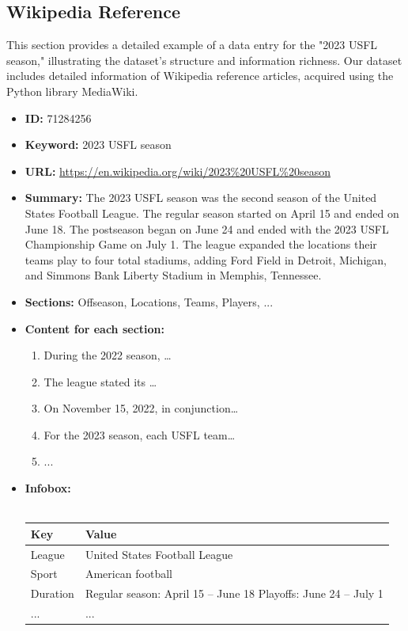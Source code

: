 \subsection{Wikipedia Reference}
This section provides a detailed example of a data entry for the "2023 USFL season," illustrating the dataset's structure and information richness.
Our dataset includes detailed information of Wikipedia reference articles, acquired using the Python library MediaWiki.
\begin{tcolorbox}
\begin{itemize}
    \item \textbf{ID:} 71284256
    \item \textbf{Keyword:} 2023 USFL season
    \item \textbf{URL:} \url{https://en.wikipedia.org/wiki/2023%20USFL%20season}
    \item \textbf{Summary:} The 2023 USFL season was the second season of the United States Football League. The regular season started on April 15 and ended on June 18. The postseason began on June 24 and ended with the 2023 USFL Championship Game on July 1. The league expanded the locations their teams play to four total stadiums, adding Ford Field in Detroit, Michigan, and Simmons Bank Liberty Stadium in Memphis, Tennessee.
    \item \textbf{Sections:} Offseason, Locations, Teams, Players, ...
    \item \textbf{Content for each section:} 
    \begin{enumerate}
        \item During the 2022 season, …
        \item The league stated its …
        \item On November 15, 2022, in conjunction…
        \item For the 2023 season, each USFL team…
        \item ...
    \end{enumerate}
    \item \textbf{Infobox:}  \\
    \\
    \begin{tabular}{|l|p{10cm}|}
    \hline
    \textbf{Key} & \textbf{Value} \\
    \hline
    League & United States Football League \\
    Sport & American football \\
    Duration & Regular season: April 15 – June 18 Playoffs: June 24 – July 1 \\
    ... & ...\\
    \hline
    \end{tabular}
\end{itemize}
\end{tcolorbox}

